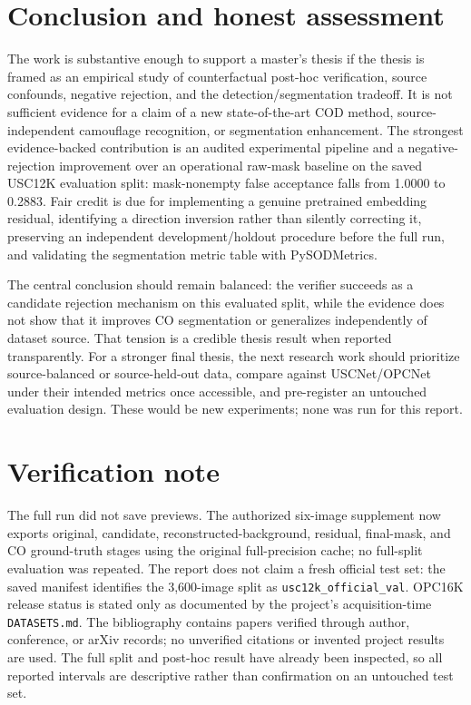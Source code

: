 \documentclass[10pt,a4paper]{article}
\begin{document}
\section{Conclusion and honest assessment}
The work is substantive enough to support a master's thesis if the thesis is framed as an empirical study of counterfactual post-hoc verification, source confounds, negative rejection, and the detection/segmentation tradeoff. It is not sufficient evidence for a claim of a new state-of-the-art COD method, source-independent camouflage recognition, or segmentation enhancement. The strongest evidence-backed contribution is an audited experimental pipeline and a negative-rejection improvement over an operational raw-mask baseline on the saved USC12K evaluation split: mask-nonempty false acceptance falls from 1.0000 to 0.2883. Fair credit is due for implementing a genuine pretrained embedding residual, identifying a direction inversion rather than silently correcting it, preserving an independent development/holdout procedure before the full run, and validating the segmentation metric table with PySODMetrics.

The central conclusion should remain balanced: the verifier succeeds as a candidate rejection mechanism on this evaluated split, while the evidence does not show that it improves CO segmentation or generalizes independently of dataset source. That tension is a credible thesis result when reported transparently. For a stronger final thesis, the next research work should prioritize source-balanced or source-held-out data, compare against USCNet/OPCNet under their intended metrics once accessible, and pre-register an untouched evaluation design. These would be new experiments; none was run for this report.

\section*{Verification note}
The full run did not save previews. The authorized six-image supplement now exports original, candidate, reconstructed-background, residual, final-mask, and CO ground-truth stages using the original full-precision cache; no full-split evaluation was repeated. The report does not claim a fresh official test set: the saved manifest identifies the 3,600-image split as \texttt{usc12k\_official\_val}. OPC16K release status is stated only as documented by the project's acquisition-time \texttt{DATASETS.md}. The bibliography contains papers verified through author, conference, or arXiv records; no unverified citations or invented project results are used. The full split and post-hoc result have already been inspected, so all reported intervals are descriptive rather than confirmation on an untouched test set.
\end{document}
